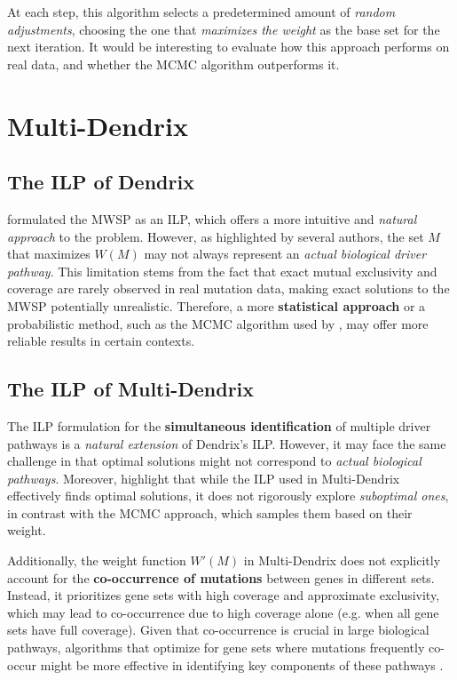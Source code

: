 At each step, this algorithm selects a predetermined amount of \textit{random adjustments}, choosing the one that \textit{maximizes the weight} as the base set for the next iteration. It would be interesting to evaluate how this approach performs on real data, and whether the MCMC algorithm outperforms it.

\section{Multi-Dendrix}

\subsection{The ILP of Dendrix}

\textcite{multi-dendrix} formulated the MWSP as an ILP, which offers a more intuitive and \textit{natural approach} to the problem. However, as highlighted by several authors, the set $M$ that maximizes $W(M)$ may not always represent an \textit{actual biological driver pathway}. This limitation stems from the fact that exact mutual exclusivity and coverage are rarely observed in real mutation data, making exact solutions to the MWSP potentially unrealistic. Therefore, a more \textbf{statistical approach} or a probabilistic method, such as the MCMC algorithm used by \textcite{dendrix}, may offer more reliable results in certain contexts.

\subsection{The ILP of Multi-Dendrix}

The ILP formulation for the \textbf{simultaneous identification} of multiple driver pathways is a \textit{natural extension} of Dendrix's ILP. However, it may face the same challenge in that optimal solutions might not correspond to \textit{actual biological pathways}. Moreover, \textcite{multi-dendrix} highlight that while the ILP used in Multi-Dendrix effectively finds optimal solutions, it does not rigorously explore \textit{suboptimal ones}, in contrast with the MCMC approach, which samples them based on their weight.

Additionally, the weight function $W'(M)$ in Multi-Dendrix does not explicitly account for the \textbf{co-occurrence of mutations} between genes in different sets. Instead, it prioritizes gene sets with high coverage and approximate exclusivity, which may lead to co-occurrence due to high coverage alone (e.g. when all gene sets have full coverage). Given that co-occurrence is crucial in large biological pathways, algorithms that optimize for gene sets where mutations frequently co-occur might be more effective in identifying key components of these pathways \cite{multi-dendrix}.

